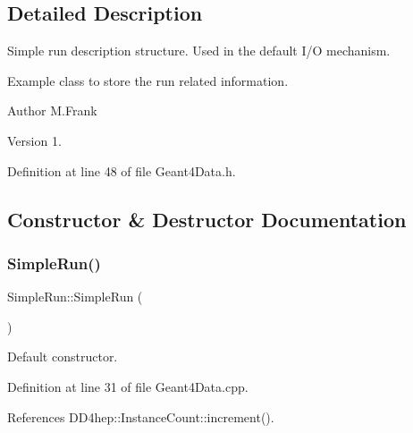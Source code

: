 \subsection{Detailed Description}
Simple run description structure. Used in the default I/O mechanism. 

Example class to store the run related information.

\begin{DoxyAuthor}{Author}
M.\+Frank 
\end{DoxyAuthor}
\begin{DoxyVersion}{Version}
1. 
\end{DoxyVersion}


Definition at line 48 of file Geant4\+Data.\+h.



\subsection{Constructor \& Destructor Documentation}
\hypertarget{class_d_d4hep_1_1_simulation_1_1_simple_run_a50e522275d994ec00d6e3a2d842713d5}{}\label{class_d_d4hep_1_1_simulation_1_1_simple_run_a50e522275d994ec00d6e3a2d842713d5} 
\subsubsection{\texorpdfstring{Simple\+Run()}{SimpleRun()}}
{\footnotesize\ttfamily Simple\+Run\+::\+Simple\+Run (\begin{DoxyParamCaption}{ }\end{DoxyParamCaption})}



Default constructor. 



Definition at line 31 of file Geant4\+Data.\+cpp.



References D\+D4hep\+::\+Instance\+Count\+::increment().

\hypertarget{class_d_d4hep_1_1_simulation_1_1_simple_run_a492b495267498387129a39d1c3da0850}{}\label{class_d_d4hep_1_1_simulation_1_1_simple_run_a492b495267498387129a39d1c3da0850} 
